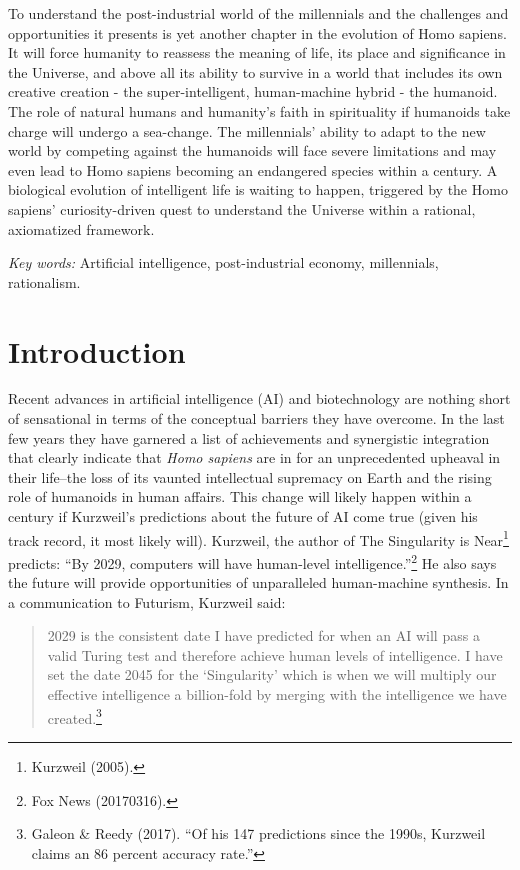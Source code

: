 \begin{multicols}{2}
To understand the post-industrial world of the millennials and the challenges and opportunities it presents is yet another chapter in the evolution of Homo sapiens. It will force humanity to reassess the meaning of life, its place and significance in the Universe, and above all its ability to survive in a world that includes its own creative creation - the super-intelligent, human-machine hybrid - the humanoid. The role of natural humans and humanity's faith in spirituality if humanoids take charge will undergo a sea-change. The millennials' ability to adapt to the new world by competing against the humanoids will face severe limitations and may even lead to Homo sapiens becoming an endangered species within a century. A biological evolution of intelligent life is waiting to happen, triggered by the Homo sapiens’ curiosity-driven quest to understand the Universe within a rational, axiomatized framework.

\textit{Key words:} Artificial intelligence, post-industrial economy, millennials, rationalism.

\section{Introduction}

Recent advances in artificial intelligence (AI) and biotechnology are nothing short of sensational in terms of the conceptual barriers they have overcome. In the last few years they have garnered a list of achievements and synergistic integration that clearly indicate that \textit{Homo sapiens} are in for an unprecedented upheaval in their life--the loss of its vaunted intellectual supremacy on Earth and the rising role of humanoids in human affairs. This change will likely happen within a century if Kurzweil's predictions about the future of AI come true (given his track record, it most likely will). Kurzweil, the author of The Singularity is Near\footnote{Kurzweil (2005).} predicts: “By 2029, computers will have human-level intelligence.”\footnote{Fox News (20170316).} He also says the future will provide opportunities of unparalleled human-machine synthesis. In a communication to Futurism, Kurzweil said:
\begin{quote}
2029 is the consistent date I have predicted for when an AI will pass a valid Turing test and therefore achieve human levels of intelligence. I have set the date 2045 for the `Singularity' which is when we will multiply our effective intelligence a billion-fold by merging with the intelligence we have created.\footnote{Galeon \& Reedy (2017). “Of his 147 predictions since the 1990s, Kurzweil claims an 86 percent accuracy rate.”}
\end{quote}


\end{multicols}
